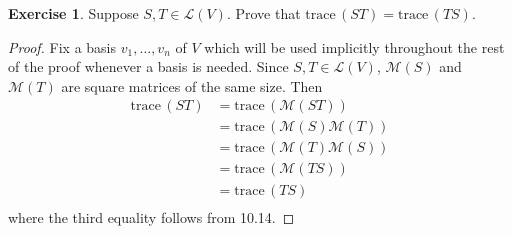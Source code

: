 \documentclass{article}
\theoremstyle{definition}
\newtheorem{ex}{Exercise}
\begin{document}
\begin{ex}
	Suppose $S, T \in \mathcal{L}(V)$. Prove that $\mathrm{trace}\,(ST) = \mathrm{trace}\,(TS)$.
\end{ex}
\begin{proof}
	Fix a basis $v_1, \dots, v_n$ of $V$ which will be used implicitly throughout the rest of the proof whenever a basis is needed.
	Since $S, T \in \mathcal{L}(V)$, $\mathcal{M}(S)$ and $\mathcal{M}(T)$ are square matrices of the same size.
	Then \begin{align*}
		\mathrm{trace}\,(ST) & = \mathrm{trace}\,(\mathcal{M}(ST))              \\
		                     & = \mathrm{trace}\,(\mathcal{M}(S)\mathcal{M}(T)) \\
		                     & = \mathrm{trace}\,(\mathcal{M}(T)\mathcal{M}(S)) \\
		                     & = \mathrm{trace}\,(\mathcal{M}(TS))              \\
		                     & = \mathrm{trace}\,(TS)                           \\
	\end{align*}
	where the third equality follows from 10.14.
\end{proof}
\end{document}
